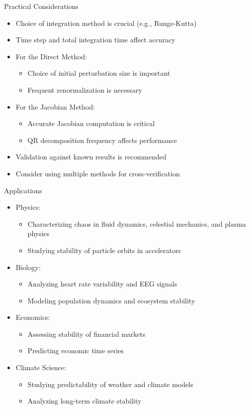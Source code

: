 \documentclass{beamer}
\begin{document}
\begin{frame}{Practical Considerations}
\begin{itemize}
    \item Choice of integration method is crucial (e.g., Runge-Kutta)
    \item Time step and total integration time affect accuracy
    \item For the Direct Method:
    \begin{itemize}
        \item Choice of initial perturbation size is important
        \item Frequent renormalization is necessary
    \end{itemize}
    \item For the Jacobian Method:
    \begin{itemize}
        \item Accurate Jacobian computation is critical
        \item QR decomposition frequency affects performance
    \end{itemize}
    \item Validation against known results is recommended
    \item Consider using multiple methods for cross-verification
\end{itemize}
\end{frame}
\begin{frame}{Applications}
\begin{itemize}
    \item Physics:
    \begin{itemize}
        \item Characterizing chaos in fluid dynamics, celestial mechanics, and plasma physics
        \item Studying stability of particle orbits in accelerators
    \end{itemize}
    \item Biology:
    \begin{itemize}
        \item Analyzing heart rate variability and EEG signals
        \item Modeling population dynamics and ecosystem stability
    \end{itemize}
    \item Economics:
    \begin{itemize}
        \item Assessing stability of financial markets
        \item Predicting economic time series
    \end{itemize}
    \item Climate Science:
    \begin{itemize}
        \item Studying predictability of weather and climate models
        \item Analyzing long-term climate stability
    \end{itemize}
\end{itemize}
\end{frame}
\end{document}
